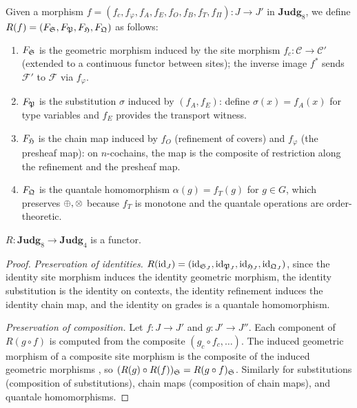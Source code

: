\begin{construction}[$R$ on morphisms]
\label{con:R-morphisms}
Given a morphism $f = (f_c, f_\varphi, f_A, f_E, f_O, f_B, f_T,
f_\Pi) : J \to J'$ in $\mathbf{Judg}_8$, we define
$R(f) = (F_{\mathfrak{S}}, F_{\mathfrak{P}}, F_{\mathfrak{H}}, F_{\mathfrak{Q}})$ as follows:
\begin{enumerate}[label=(\roman*),nosep]
\item $F_{\mathfrak{S}}$ is the geometric morphism induced by the site
  morphism $f_c : \mathcal{C} \to \mathcal{C}'$ (extended to a
  continuous functor between sites); the inverse image
  $f^*$ sends $\mathcal{F}'$ to $\mathcal{F}$ via $f_\varphi$.
\item $F_{\mathfrak{P}}$ is the substitution $\sigma$ induced by
  $(f_A, f_E)$: define $\sigma(x) = f_A(x)$ for type variables and
  $f_E$ provides the transport witness.
\item $F_{\mathfrak{H}}$ is the chain map induced by $f_O$ (refinement of
  covers) and $f_\varphi$ (the presheaf map): on $n$-cochains,
  the map is the composite of restriction along the refinement
  and the presheaf map.
\item $F_{\mathfrak{Q}}$ is the quantale homomorphism
  $\alpha(g) = f_T(g)$ for $g \in G$, which preserves
  $\oplus, \otimes$ because $f_T$ is monotone and the quantale
  operations are order-theoretic.
\end{enumerate}
\end{construction}

\begin{proposition}
\label{prop:R-functor}
$R : \mathbf{Judg}_8 \to \mathbf{Judg}_4$ is a functor.
\end{proposition}

\begin{proof}
\emph{Preservation of identities.}  $R(\mathrm{id}_J) = (\mathrm{id}_{\mathfrak{S}_J},
\mathrm{id}_{\mathfrak{P}_J}, \mathrm{id}_{\mathfrak{H}_J}, \mathrm{id}_{\mathfrak{Q}_J})$, since the identity
site morphism induces the identity geometric morphism, the identity
substitution is the identity on contexts, the identity refinement
induces the identity chain map, and the identity on grades is a
quantale homomorphism.

\emph{Preservation of composition.}  Let $f : J \to J'$ and
$g : J' \to J''$.  Each component of $R(g \circ f)$ is computed from
the composite $(g_c \circ f_c, \ldots)$.  The induced geometric
morphism of a composite site morphism is the composite of the
induced geometric morphisms \cite{johnstone2002}, so
$(R(g) \circ R(f))_{\mathfrak{S}} = R(g \circ f)_{\mathfrak{S}}$.  Similarly for
substitutions (composition of substitutions), chain maps (composition
of chain maps), and quantale homomorphisms.
\end{proof}

